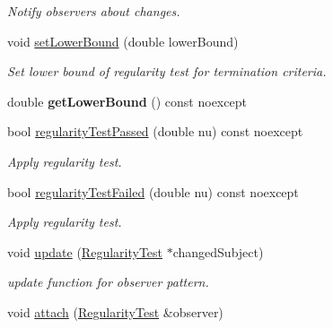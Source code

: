 \begin{DoxyCompactItemize}
\begin{DoxyCompactList}\small\item\em Notify observers about changes. \end{DoxyCompactList}\item 
void \hyperlink{classSpacy_1_1Mixin_1_1RegularityTest_a29ae1c15b8447601c2a783352e01bde2}{set\+Lower\+Bound} (double lower\+Bound)\hypertarget{classSpacy_1_1Mixin_1_1RegularityTest_a29ae1c15b8447601c2a783352e01bde2}{}\label{classSpacy_1_1Mixin_1_1RegularityTest_a29ae1c15b8447601c2a783352e01bde2}

\begin{DoxyCompactList}\small\item\em Set lower bound of regularity test for termination criteria. \end{DoxyCompactList}\item 
double {\bfseries get\+Lower\+Bound} () const noexcept\hypertarget{classSpacy_1_1Mixin_1_1RegularityTest_abc194f9b2150b6f02622867f673df4df}{}\label{classSpacy_1_1Mixin_1_1RegularityTest_abc194f9b2150b6f02622867f673df4df}

\item 
bool \hyperlink{classSpacy_1_1Mixin_1_1RegularityTest_a606383e629ebc0e84dc1cb6796aeeae1}{regularity\+Test\+Passed} (double nu) const noexcept
\begin{DoxyCompactList}\small\item\em Apply regularity test. \end{DoxyCompactList}\item 
bool \hyperlink{classSpacy_1_1Mixin_1_1RegularityTest_ac16e5fb18f3b591da58e32b821345f3d}{regularity\+Test\+Failed} (double nu) const noexcept
\begin{DoxyCompactList}\small\item\em Apply regularity test. \end{DoxyCompactList}\item 
void \hyperlink{classSpacy_1_1Mixin_1_1RegularityTest_a1a6191e20f84025cec8b10ec63ab94ac}{update} (\hyperlink{classSpacy_1_1Mixin_1_1RegularityTest_a89c4ffe9b8891c1f81d57e84141a2ef6}{Regularity\+Test} $\ast$changed\+Subject)\hypertarget{classSpacy_1_1Mixin_1_1RegularityTest_a1a6191e20f84025cec8b10ec63ab94ac}{}\label{classSpacy_1_1Mixin_1_1RegularityTest_a1a6191e20f84025cec8b10ec63ab94ac}

\begin{DoxyCompactList}\small\item\em update function for observer pattern. \end{DoxyCompactList}\item 
void \hyperlink{classSpacy_1_1Mixin_1_1MixinConnection_abb5520ee6b22dd993d78f142939a1ed4}{attach} (\hyperlink{classSpacy_1_1Mixin_1_1RegularityTest_a89c4ffe9b8891c1f81d57e84141a2ef6}{Regularity\+Test} \&observer)\hypertarget{classSpacy_1_1Mixin_1_1MixinConnection_abb5520ee6b22dd993d78f142939a1ed4}{}\label{classSpacy_1_1Mixin_1_1MixinConnection_abb5520ee6b22dd993d78f142939a1ed4}


\end{DoxyCompactItemize}
